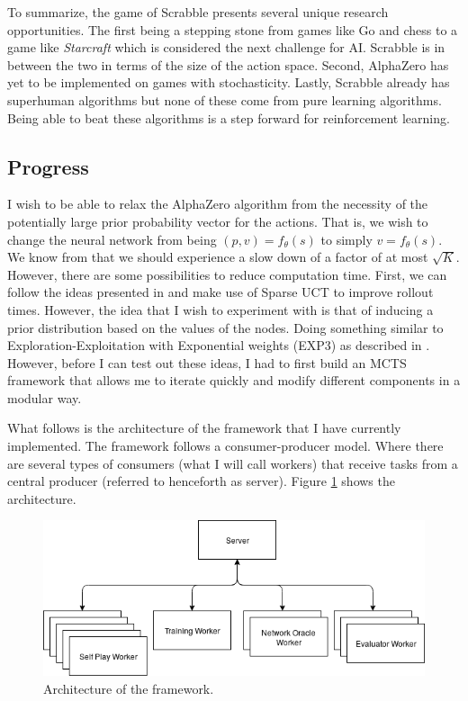 \documentclass{article}
\begin{document}
  To summarize, the game of Scrabble presents several unique research opportunities. The first being a stepping stone from games like Go and chess to a game like \textit{Starcraft} which is considered the next challenge for AI. Scrabble is in between the two in terms of the size of the action space. Second, AlphaZero has yet to be implemented on games with stochasticity. Lastly, Scrabble already has superhuman algorithms but none of these come from pure learning algorithms. Being able to beat these algorithms is a step forward for reinforcement learning.


  \subsection{Progress}

  I wish to be able to relax the AlphaZero algorithm from the necessity of the potentially large prior probability vector for the actions. That is, we wish to change the neural network from being $(p,v) = f_{\theta}(s)$ to simply $v = f_{\theta}(s)$. We know from \cite{rosin_multi-armed_2011} that we should experience a slow down of a factor of at most $\sqrt{K}$. However, there are some possibilities to reduce computation time. First, we can follow the ideas presented in \cite{bjarnason_lower_2009} and make use of Sparse UCT to improve rollout times. However, the idea that I wish to experiment with is that of inducing a prior distribution based on the values of the nodes. Doing something similar to Exploration-Exploitation with Exponential weights (EXP3) as described in \cite{audibert_minimax_2009}. However, before I can test out these ideas, I had to first build an MCTS framework that allows me to iterate quickly and modify different components in a modular way.

  What follows is the architecture of the framework that I have currently implemented. The framework follows a consumer-producer model. Where there are several types of consumers (what I will call workers) that receive tasks from a central producer (referred to henceforth as server). Figure \ref{fig:architecture} shows the architecture.

  \begin{figure}[H]
    \centering
      \includegraphics[width=\textwidth]{architecture}
    \caption[Architecture of framework]{Architecture of the framework.}
    \label{fig:architecture}
  \end{figure}
\end{document}
